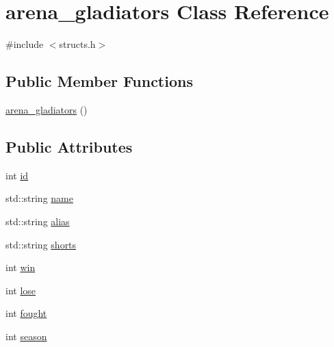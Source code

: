 \hypertarget{classarena__gladiators}{\section{arena\-\_\-gladiators Class Reference}
\label{classarena__gladiators}
}


{\ttfamily \#include $<$structs.\-h$>$}

\subsection*{Public Member Functions}
\begin{DoxyCompactItemize}
\item 
\hyperlink{classarena__gladiators_afb4bab9367976a86f7e21b9c1f3353f6}{arena\-\_\-gladiators} ()
\end{DoxyCompactItemize}
\subsection*{Public Attributes}
\begin{DoxyCompactItemize}
\item 
int \hyperlink{classarena__gladiators_a8ca809345e524c1e1c6aec14f8e22a44}{id}
\item 
std\-::string \hyperlink{classarena__gladiators_abbfb775525439f543d6a604347418340}{name}
\item 
std\-::string \hyperlink{classarena__gladiators_a123efad23d061b043c9d09f083b18c2f}{alias}
\item 
std\-::string \hyperlink{classarena__gladiators_a280427370690bf3901a8f10608956bcc}{shorts}
\item 
int \hyperlink{classarena__gladiators_aa60a43b4f54e94e1df157113274ac496}{win}
\item 
int \hyperlink{classarena__gladiators_a43b6183e03a4552bbf147bc7825868b5}{lose}
\item 
int \hyperlink{classarena__gladiators_a2d3441bfc9a46e7ccf83d2328edd1981}{fought}
\item 
int \hyperlink{classarena__gladiators_a45308edb01250c153c628713bc14e5f4}{season}
\end{DoxyCompactItemize}


